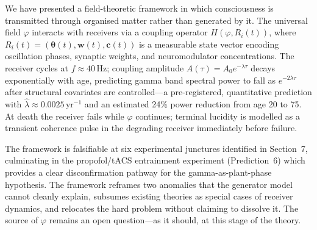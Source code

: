 \documentclass[12pt]{article}
\begin{document}
We have presented a field-theoretic framework in which consciousness is transmitted through organised matter rather than generated by it. The universal field $\varphi$ interacts with receivers via a coupling operator $H(\varphi, R_i(t))$, where $R_i(t) = (\boldsymbol{\theta}(t), \mathbf{w}(t), \mathbf{c}(t))$ is a measurable state vector encoding oscillation phases, synaptic weights, and neuromodulator concentrations. The receiver cycles at $f \approx 40$\,Hz; coupling amplitude $A(\tau) = A_0 e^{-\lambda\tau}$ decays exponentially with age, predicting gamma band spectral power to fall as $e^{-2\lambda\tau}$ after structural covariates are controlled---a pre-registered, quantitative prediction with $\hat{\lambda}\approx 0.0025\,\mathrm{yr}^{-1}$ and an estimated 24\% power reduction from age 20 to 75. At death the receiver fails while $\varphi$ continues; terminal lucidity is modelled as a transient coherence pulse in the degrading receiver immediately before failure.

The framework is falsifiable at six experimental junctures identified in Section~7, culminating in the propofol/tACS entrainment experiment (Prediction~6) which provides a clear disconfirmation pathway for the gamma-as-plant-phase hypothesis. The framework reframes two anomalies that the generator model cannot cleanly explain, subsumes existing theories as special cases of receiver dynamics, and relocates the hard problem without claiming to dissolve it. The source of $\varphi$ remains an open question---as it should, at this stage of the theory.



\end{document}
